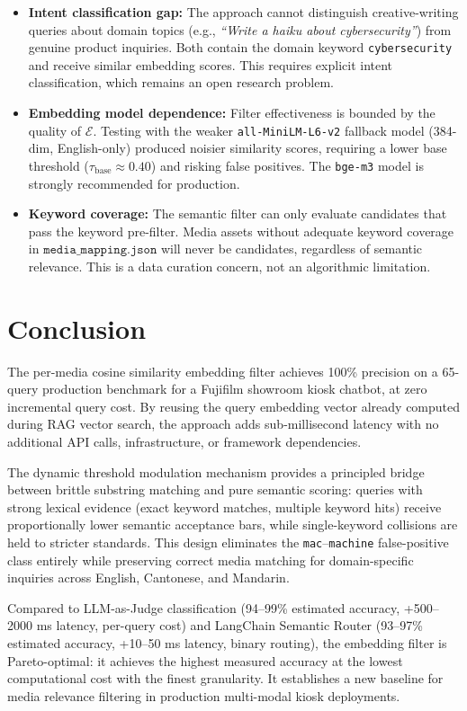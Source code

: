 \documentclass{article}
\begin{document}
\begin{itemize}
  \item \textbf{Intent classification gap:} The approach cannot distinguish creative-writing queries about domain topics (e.g., \textit{``Write a haiku about cybersecurity''}) from genuine product inquiries. Both contain the domain keyword \texttt{cybersecurity} and receive similar embedding scores. This requires explicit intent classification, which remains an open research problem.
  \item \textbf{Embedding model dependence:} Filter effectiveness is bounded by the quality of $\mathcal{E}$. Testing with the weaker \texttt{all-MiniLM-L6-v2} fallback model (384-dim, English-only) produced noisier similarity scores, requiring a lower base threshold ($\tau_{\text{base}} \approx 0.40$) and risking false positives. The \texttt{bge-m3} model is strongly recommended for production.
  \item \textbf{Keyword coverage:} The semantic filter can only evaluate candidates that pass the keyword pre-filter. Media assets without adequate keyword coverage in $\texttt{media\_mapping.json}$ will never be candidates, regardless of semantic relevance. This is a data curation concern, not an algorithmic limitation.
\end{itemize}

\section{Conclusion}

The per-media cosine similarity embedding filter achieves 100\% precision on a 65-query production benchmark for a Fujifilm showroom kiosk chatbot, at zero incremental query cost. By reusing the query embedding vector already computed during RAG vector search, the approach adds sub-millisecond latency with no additional API calls, infrastructure, or framework dependencies.

The dynamic threshold modulation mechanism provides a principled bridge between brittle substring matching and pure semantic scoring: queries with strong lexical evidence (exact keyword matches, multiple keyword hits) receive proportionally lower semantic acceptance bars, while single-keyword collisions are held to stricter standards. This design eliminates the \texttt{mac}--\texttt{machine} false-positive class entirely while preserving correct media matching for domain-specific inquiries across English, Cantonese, and Mandarin.

Compared to LLM-as-Judge classification (94--99\% estimated accuracy, +500--2000 ms latency, per-query cost) and LangChain Semantic Router (93--97\% estimated accuracy, +10--50 ms latency, binary routing), the embedding filter is Pareto-optimal: it achieves the highest measured accuracy at the lowest computational cost with the finest granularity. It establishes a new baseline for media relevance filtering in production multi-modal kiosk deployments.
\end{document}
